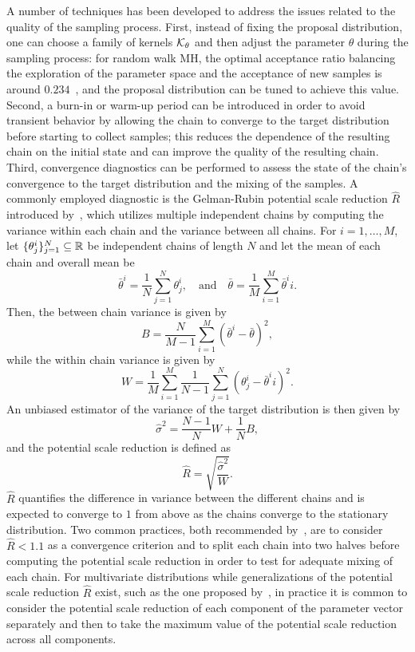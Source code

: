 A number of techniques has been developed to address the issues related to the quality of the sampling process.
First, instead of fixing the proposal distribution, one can choose a family of kernels $\mathcal K_\theta$ and then adjust the parameter $\theta$ during the sampling process: for random walk MH, the optimal acceptance ratio balancing the exploration of the parameter space and the acceptance of new samples is around $0.234$~\cite{GelmanGilksRoberts1997}, and the proposal distribution can be tuned to achieve this value.
Second, a burn-in or warm-up period can be introduced in order to avoid transient behavior by allowing the chain to converge to the target distribution before starting to collect samples; this reduces the dependence of the resulting chain on the initial state and can improve the quality of the resulting chain.
Third, convergence diagnostics can be performed to assess the state of the chain's convergence to the target distribution and the mixing of the samples.
A commonly employed diagnostic is the Gelman-Rubin potential scale reduction $\hat R$ introduced by~\cite{GelmanRubin1992}, which utilizes multiple independent chains by computing the variance within each chain and the variance between all chains.
For $i =1, \dots, M$, let $\{ \theta_{j}^i \}_{j=1}^{N} \subseteq \mathbb{R} $ be independent chains of length $N$ and let the mean of each chain and overall mean be 
\[
    \bar \theta^i = \frac{1}{N} \sum_{j=1}^{N} \theta_{j}^i, \quad \text{and} \quad \bar \theta = \frac{1}{M} \sum_{i=1}^{M} \bar \theta^ii.
\]
Then, the between chain variance is given by
\[
    B = \frac{N}{M-1} \sum_{i=1}^{M} (\bar \theta^i - \bar \theta)^2,
\]
while the within chain variance is given by
\[
    W = \frac{1}{M} \sum_{i=1}^{M} \frac{1}{N-1} \sum_{j=1}^{N} (\theta_{j}^i - \bar \theta^ii)^2.
\]
An unbiased estimator of the variance of the target distribution is then given by
\[
    \hat \sigma^2 = \frac{N-1}{N} W + \frac{1}{N}B,
\]
and the potential scale reduction is defined as 
\begin{equation}\label{eq:hatR}
    \hat R = \sqrt{ \frac{\hat \sigma^2}{W} }.
\end{equation}
$\hat R$ quantifies the difference in variance between the different chains and is expected to converge to $1$ from above as the chains converge to the stationary distribution. 
Two common practices, both recommended by~\cite[Chapter 11.4]{GelmanCarlinSternDunsonVehtariRubin2013}, are to consider $\hat R < 1.1$ as a convergence criterion and to split each chain into two halves before computing the potential scale reduction in order to test for adequate mixing of each chain.
For multivariate distributions while generalizations of the potential scale reduction $\hat R$ exist, such as the one proposed by~\cite{BrooksGelman1998}, in practice it is common to consider the potential scale reduction of each component of the parameter vector separately and then to take the maximum value of the potential scale reduction across all components.

